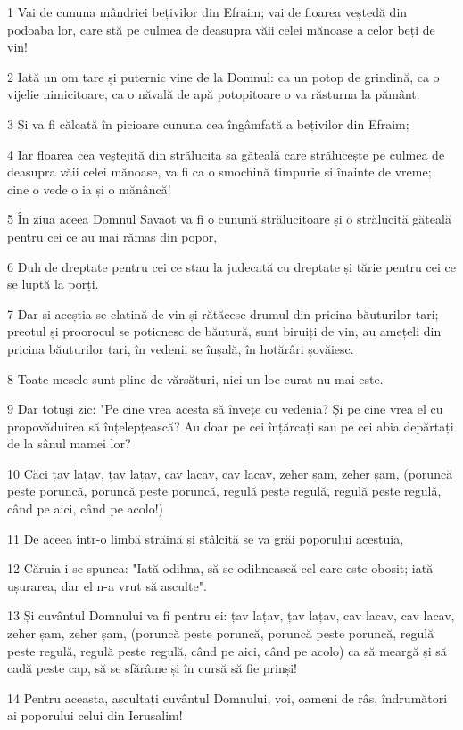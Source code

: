 \par 1 Vai de cununa mândriei bețivilor din Efraim; vai de floarea veștedă din podoaba lor, care stă pe culmea de deasupra văii celei mănoase a celor beți de vin!
\par 2 Iată un om tare și puternic vine de la Domnul: ca un potop de grindină, ca o vijelie nimicitoare, ca o năvală de apă potopitoare o va răsturna la pământ.
\par 3 Și va fi călcată în picioare cununa cea îngâmfată a bețivilor din Efraim;
\par 4 Iar floarea cea veștejită din strălucita sa găteală care strălucește pe culmea de deasupra văii celei mănoase, va fi ca o smochină timpurie și înainte de vreme; cine o vede o ia și o mănâncă!
\par 5 În ziua aceea Domnul Savaot va fi o cunună strălucitoare și o strălucită găteală pentru cei ce au mai rămas din popor,
\par 6 Duh de dreptate pentru cei ce stau la judecată cu dreptate și tărie pentru cei ce se luptă la porți.
\par 7 Dar și aceștia se clatină de vin și rătăcesc drumul din pricina băuturilor tari; preotul și proorocul se poticnesc de băutură, sunt biruiți de vin, au amețeli din pricina băuturilor tari, în vedenii se înșală, în hotărâri șovăiesc.
\par 8 Toate mesele sunt pline de vărsături, nici un loc curat nu mai este.
\par 9 Dar totuși zic: "Pe cine vrea acesta să învețe cu vedenia? Și pe cine vrea el cu propovăduirea să înțelepțească? Au doar pe cei înțărcați sau pe cei abia depărtați de la sânul mamei lor?
\par 10 Căci țav lațav, țav lațav, cav lacav, cav lacav, zeher șam, zeher șam, (poruncă peste poruncă, poruncă peste poruncă, regulă peste regulă, regulă peste regulă, când pe aici, când pe acolo!)
\par 11 De aceea într-o limbă străină și stâlcită se va grăi poporului acestuia,
\par 12 Căruia i se spunea: "Iată odihna, să se odihnească cel care este obosit; iată ușurarea, dar el n-a vrut să asculte".
\par 13 Și cuvântul Domnului va fi pentru ei: țav lațav, țav lațav, cav lacav, cav lacav, zeher șam, zeher șam, (poruncă peste poruncă, poruncă peste poruncă, regulă peste regulă, regulă peste regulă, când pe aici, când pe acolo) ca să meargă și să cadă peste cap, să se sfărâme și în cursă să fie prinși!
\par 14 Pentru aceasta, ascultați cuvântul Domnului, voi, oameni de râs, îndrumători ai poporului celui din Ierusalim!
